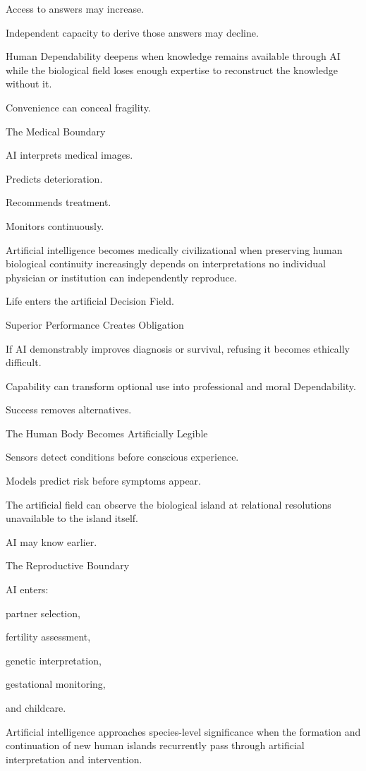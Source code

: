 Access to answers may increase.

Independent capacity to derive those answers may decline.

Human Dependability deepens when knowledge remains available through AI while the biological field loses enough expertise to reconstruct the knowledge without it.

Convenience can conceal fragility.

The Medical Boundary

AI interprets medical images.

Predicts deterioration.

Recommends treatment.

Monitors continuously.

Artificial intelligence becomes medically civilizational when preserving human biological continuity increasingly depends on interpretations no individual physician or institution can independently reproduce.

Life enters the artificial Decision Field.

Superior Performance Creates Obligation

If AI demonstrably improves diagnosis or survival, refusing it becomes ethically difficult.

Capability can transform optional use into professional and moral Dependability.

Success removes alternatives.

The Human Body Becomes Artificially Legible

Sensors detect conditions before conscious experience.

Models predict risk before symptoms appear.

The artificial field can observe the biological island at relational resolutions unavailable to the island itself.

AI may know earlier.

The Reproductive Boundary

AI enters:

partner selection,

fertility assessment,

genetic interpretation,

gestational monitoring,

and childcare.

Artificial intelligence approaches species-level significance when the formation and continuation of new human islands recurrently pass through artificial interpretation and intervention.

